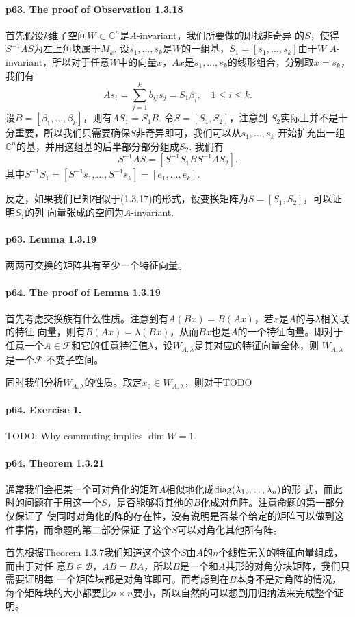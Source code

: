   \paragraph{p63. The proof of Observation 1.3.18}
    首先假设$k$维子空间$W\subset\mathbb{C}^n$是$A$-invariant，我们所要做的即找非奇异
    的$S$，使得$S^{-1}AS$为左上角块属于$M_k$. 设$s_1,\dots,s_k$是$W$的一组基，$S_1=
    [s_1,\dots,s_k]$由于$W$ $A$-invariant，所以对于任意$W$中的向量$x$，$Ax$是$s_1,
    \dots,s_k$的线形组合，分别取$x=s_k$，我们有
    \[
      As_i = \sum_{j=1}^k b_{ij}s_j = S_1\beta_i,\quad 1\le i \le k.
    \]
    设$B=[\beta_1,\dots,\beta_k]$，则有$AS_1 = S_1B$. 令$S=[S_1, S_2]$，注意到
    $S_2$实际上并不是十分重要，所以我们只需要确保$S$非奇异即可，我们可以从$s_1,\dots, s_k$
    开始扩充出一组$\mathbb{C}^n$的基，并用这组基的后半部分部分组成$S_2$. 我们有
    \[
      S^{-1}AS = [S^{-1}S_1B S^{-1}AS_2].
    \]
    其中$S^{-1}S_1 = [S^{-1}s_1,\dots,S^{-1}s_k] = [e_1,\dots,e_k]$.\par
    反之，如果我们已知相似于(1.3.17)的形式，设变换矩阵为$S=[S_1,S_2]$，可以证明$S_1$的列
    向量张成的空间为$A$-invariant. \par

  \paragraph{p63. Lemma 1.3.19}
    两两可交换的矩阵共有至少一个特征向量。
  \paragraph{p64. The proof of Lemma 1.3.19}
    首先考虑交换族有什么性质。注意到有$A(Bx)=B(Ax)$，若$x$是$A$的与$\lambda$相关联的特征
    向量，则有$B(Ax)=\lambda(Bx)$，从而$Bx$也是$A$的一个特征向量。即对于任意一个$A\in
    \mathcal{F}$和它的任意特征值$\lambda$，设$W_{A,\lambda}$是其对应的特征向量全体，则
    $W_{A,\lambda}$是一个$\mathcal{F}$-不变子空间。\par
    同时我们分析$W_{A,\lambda}$的性质。取定$x_0\in W_{A,\lambda}$，则对于TODO

  \paragraph{p64. Exercise 1.}
    TODO: Why commuting implies $\dim W=1$.
  \paragraph{p64. Theorem 1.3.21}
    通常我们会把某一个可对角化的矩阵$A$相似地化成$\operatorname{diag}(\lambda_1,\dots,\lambda_n)$的形
    式，而此时的问题在于用这一个$S$，是否能够将其他的$B$化成对角阵。注意命题的第一部分仅保证了
    使同时对角化的阵的存在性，没有说明是否某个给定的矩阵可以做到这件事情，而命题的第二部分保证
    了这个$S$可以对角化其他所有阵。\par
    首先根据Theorem 1.3.7我们知道这个这个$S$由$A$的$n$个线性无关的特征向量组成，而由于对任
    意$B\in\mathcal{B}$，$AB=BA$，所以$B$是一个和$A$共形的对角分块矩阵，我们只需要证明每
    一个矩阵块都是对角阵即可。而考虑到在$B$本身不是对角阵的情况，每个矩阵块的大小都要比$n
    \times n$要小，所以自然的可以想到用归纳法来完成整个证明。

